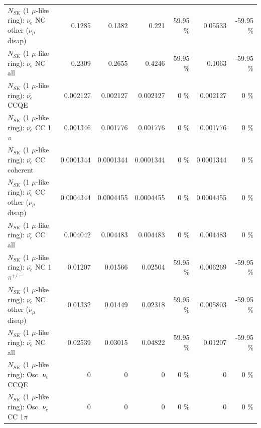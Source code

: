 \begin{table}
\begin{tabular}{| l | r | r | r  r | r  r |}
                $N_{SK}$ (1 $\mu$-like ring): $\nu_e$ NC other ($\nu_\mu$ disap) &          0.1285 &          0.1382 &           0.221 &    59.95 \%  &         0.05533 &   -59.95 \%  \\ 
                                  $N_{SK}$ (1 $\mu$-like ring): $\nu_{e}$ NC all &          0.2309 &          0.2655 &          0.4246 &    59.95 \%  &          0.1063 &   -59.95 \%  \\ 
\hline
\hline
\hline
                                $N_{SK}$ (1 $\mu$-like ring): $\bar{\nu_e}$ CCQE &        0.002127 &        0.002127 &        0.002127 &        0 \%  &        0.002127 &        0 \%  \\ 
                           $N_{SK}$ (1 $\mu$-like ring): $\bar{\nu_e}$ CC 1$\pi$ &        0.001346 &        0.001776 &        0.001776 &        0 \%  &        0.001776 &        0 \%  \\ 
                         $N_{SK}$ (1 $\mu$-like ring): $\bar{\nu_e}$ CC coherent &       0.0001344 &       0.0001344 &       0.0001344 &        0 \%  &       0.0001344 &        0 \%  \\ 
          $N_{SK}$ (1 $\mu$-like ring): $\bar{\nu_e}$ CC other ($\nu_\mu$ disap) &       0.0004344 &       0.0004455 &       0.0004455 &        0 \%  &       0.0004455 &        0 \%  \\ 
                            $N_{SK}$ (1 $\mu$-like ring): $\bar{\nu_{e}}$ CC all &        0.004042 &        0.004483 &        0.004483 &        0 \%  &        0.004483 &        0 \%  \\ 
\hline
                     $N_{SK}$ (1 $\mu$-like ring): $\bar{\nu_e}$ NC 1$\pi^{+/-}$ &         0.01207 &         0.01566 &         0.02504 &    59.95 \%  &        0.006269 &   -59.95 \%  \\ 
          $N_{SK}$ (1 $\mu$-like ring): $\bar{\nu_e}$ NC other ($\nu_\mu$ disap) &         0.01332 &         0.01449 &         0.02318 &    59.95 \%  &        0.005803 &   -59.95 \%  \\ 
                            $N_{SK}$ (1 $\mu$-like ring): $\bar{\nu_{e}}$ NC all &         0.02539 &         0.03015 &         0.04822 &    59.95 \%  &         0.01207 &   -59.95 \%  \\ 
\hline
\hline
\hline
                                 $N_{SK}$ (1 $\mu$-like ring): Osc. $\nu_e$ CCQE &               0 &               0 &               0 &        0 \%  &               0 &        0 \%  \\ 
                            $N_{SK}$ (1 $\mu$-like ring): Osc. $\nu_e$ CC 1$\pi$ &               0 &               0 &               0 &        0 \%  &               0 &        0 \%  \\ 

\end{tabular}
\end{table}
